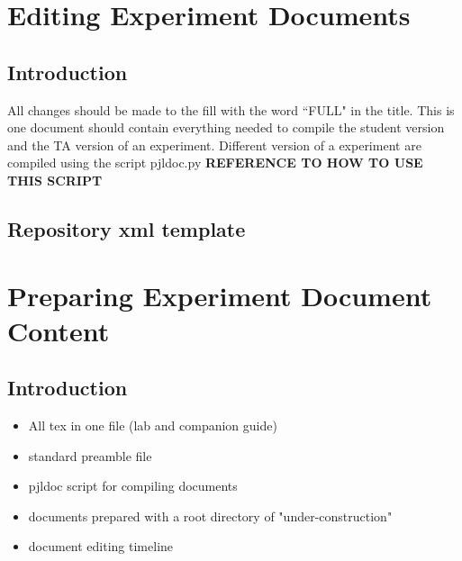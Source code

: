 \documentclass[justified]{LabArx1_5}
\begin{document}





\section{Editing Experiment Documents}\label{sec:EquipEdit}

\subsection{Introduction}

All changes should be made to the fill with the word ``FULL" in the title. This is one document should contain everything needed to compile the student version and the TA version of an experiment. Different version of a experiment are compiled using the script pjldoc.py {\bf REFERENCE TO HOW TO USE THIS SCRIPT}



\subsection{Repository xml template}



\section{Preparing Experiment Document Content}

\subsection{Introduction}
\begin{itemize}
\item All tex in one file (lab and companion guide)
\item standard preamble file
\item pjldoc script for compiling documents
\item documents prepared with a root directory of "under-construction"
\item document editing timeline
\end{itemize}
\end{document}
